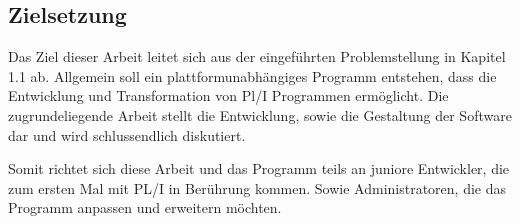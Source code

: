      
     
     



% 	 
%	 
%
    
\subsection{Zielsetzung}
Das Ziel dieser Arbeit leitet sich aus der eingeführten Problemstellung in Kapitel 1.1 ab. Allgemein soll ein plattformunabhängiges Programm entstehen, dass die  Entwicklung und Transformation von Pl/I Programmen ermöglicht. Die zugrundeliegende Arbeit stellt die Entwicklung, sowie die Gestaltung der Software dar und wird schlussendlich diskutiert. 
	
Somit richtet sich diese Arbeit und das Programm teils an juniore Entwickler, die zum ersten Mal mit PL/I in Berührung kommen. Sowie Administratoren, die das Programm anpassen und erweitern möchten. 
	
